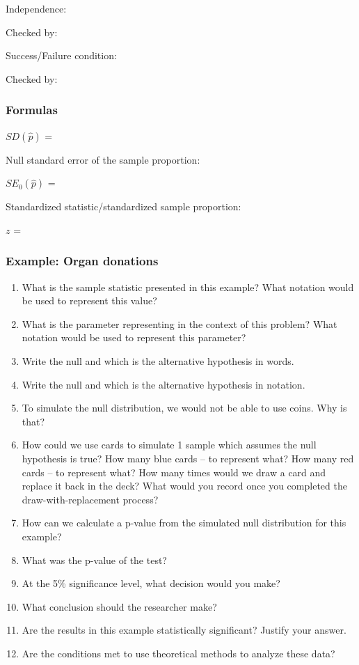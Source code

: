 \documentclass[
]{report}
\newcommand{\rgs}{\vspace{12pt}} %
\newcommand{\rgi}{\hspace{24pt}}  %
\begin{document}
\rgi Independence:
\rgs

\rgi Checked by:
\rgs

\rgi Success/Failure condition:
\rgs

\rgi Checked by:
\rgs

\hypertarget{formulas-2}{%
\subsubsection*{Formulas}\label{formulas-2}}

\(SD(\hat{p})\) =
\rgs

Null standard error of the sample proportion:

\(SE_0(\hat{p})\) =
\rgs

Standardized statistic/standardized sample proportion:

\(z\) =
\rgs

\hypertarget{example-organ-donations}{%
\subsubsection*{Example: Organ donations}\label{example-organ-donations}}

\begin{enumerate}
\def\labelenumi{\arabic{enumi}.}
\item
  What is the sample statistic presented in this example? What notation would be used to represent this value?
  \rgs
\item
  What is the parameter representing in the context of this problem? What notation would be used to represent this parameter?
  \rgs
\item
  Write the null and which is the alternative hypothesis in words.
  \rgs
\item
  Write the null and which is the alternative hypothesis in notation.
  \rgs
\item
  To simulate the null distribution, we would not be able to use coins. Why is that?
  \rgs
\item
  How could we use cards to simulate 1 sample which assumes the null hypothesis is true? How many blue cards -- to represent what? How many red cards -- to represent what? How many times would we draw a card and replace it back in the deck? What would you record once you completed the draw-with-replacement process?
  \rgs
\item
  How can we calculate a p-value from the simulated null distribution for this example?
  \rgs
\item
  What was the p-value of the test?
  \rgs
\item
  At the 5\% significance level, what decision would you make?
  \rgs
\item
  What conclusion should the researcher make?
  \rgs
\item
  Are the results in this example statistically significant? Justify your answer.
  \rgs
\item
  Are the conditions met to use theoretical methods to analyze these data?
  \rgs
\end{enumerate}
\end{document}
